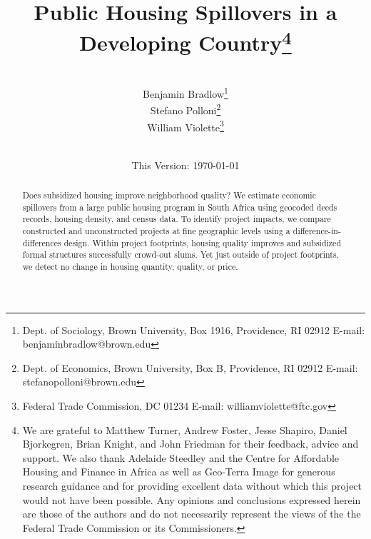 \documentclass[12pt]{article}
\begin{document}
\begin{titlepage}
\title{Public Housing Spillovers in a Developing Country\thanks{We are grateful to Matthew Turner, Andrew Foster, Jesse Shapiro, Daniel Bjorkegren, Brian Knight, and John Friedman for their feedback, advice and support.  We also thank Adelaide Steedley and the Centre for Affordable Housing and Finance in Africa as well as Geo-Terra Image for generous research guidance and for providing excellent data without which this project would not have been possible.  Any opinions and conclusions expressed herein are those of the authors and do not necessarily represent the views of the the Federal Trade Commission or its Commissioners.}}
\author{\\[3em] Benjamin Bradlow\thanks{Dept. of Sociology, Brown University, Box 1916, Providence, RI 02912  E-mail: benjamin\textunderscore bradlow@brown.edu}\\
 Stefano Polloni\thanks{Dept. of Economics, Brown University, Box B, Providence, RI 02912  E-mail: stefano\textunderscore polloni@brown.edu}\\ 
  William Violette\thanks{Federal Trade Commission, DC 01234  E-mail: william\textunderscore violette@ftc.gov} \\
 \\ 
  }
\vspace{30mm}
\date{\vspace{5mm}This Version: \today}
\maketitle
\begin{abstract}

	Does subsidized housing improve neighborhood quality? We estimate economic spillovers from a large public housing program in South Africa using geocoded deeds records, housing density, and census data.  To identify project impacts, we compare constructed and unconstructed projects at fine geographic levels using a difference-in-differences design.  Within project footprints, housing quality improves and subsidized formal structures successfully crowd-out slums. Yet just outside of project footprints, we detect no change in housing quantity, quality, or price. 

\bigskip
\end{abstract}
\setcounter{page}{0}
\thispagestyle{empty}
\end{titlepage}
\pagebreak \newpage
\end{document}

